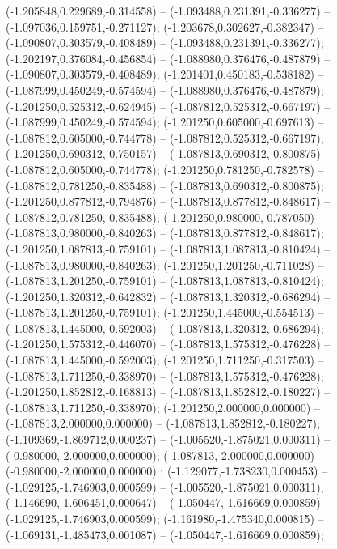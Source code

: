  (-1.205848,0.229689,-0.314558) -- (-1.093488,0.231391,-0.336277) -- (-1.097036,0.159751,-0.271127);
 (-1.203678,0.302627,-0.382347) -- (-1.090807,0.303579,-0.408489) -- (-1.093488,0.231391,-0.336277);
 (-1.202197,0.376084,-0.456854) -- (-1.088980,0.376476,-0.487879) -- (-1.090807,0.303579,-0.408489);
 (-1.201401,0.450183,-0.538182) -- (-1.087999,0.450249,-0.574594) -- (-1.088980,0.376476,-0.487879);
 (-1.201250,0.525312,-0.624945) -- (-1.087812,0.525312,-0.667197) -- (-1.087999,0.450249,-0.574594);
 (-1.201250,0.605000,-0.697613) -- (-1.087812,0.605000,-0.744778) -- (-1.087812,0.525312,-0.667197);
 (-1.201250,0.690312,-0.750157) -- (-1.087813,0.690312,-0.800875) -- (-1.087812,0.605000,-0.744778);
 (-1.201250,0.781250,-0.782578) -- (-1.087812,0.781250,-0.835488) -- (-1.087813,0.690312,-0.800875);
 (-1.201250,0.877812,-0.794876) -- (-1.087813,0.877812,-0.848617) -- (-1.087812,0.781250,-0.835488);
 (-1.201250,0.980000,-0.787050) -- (-1.087813,0.980000,-0.840263) -- (-1.087813,0.877812,-0.848617);
 (-1.201250,1.087813,-0.759101) -- (-1.087813,1.087813,-0.810424) -- (-1.087813,0.980000,-0.840263);
 (-1.201250,1.201250,-0.711028) -- (-1.087813,1.201250,-0.759101) -- (-1.087813,1.087813,-0.810424);
 (-1.201250,1.320312,-0.642832) -- (-1.087813,1.320312,-0.686294) -- (-1.087813,1.201250,-0.759101);
 (-1.201250,1.445000,-0.554513) -- (-1.087813,1.445000,-0.592003) -- (-1.087813,1.320312,-0.686294);
 (-1.201250,1.575312,-0.446070) -- (-1.087813,1.575312,-0.476228) -- (-1.087813,1.445000,-0.592003);
 (-1.201250,1.711250,-0.317503) -- (-1.087813,1.711250,-0.338970) -- (-1.087813,1.575312,-0.476228);
 (-1.201250,1.852812,-0.168813) -- (-1.087813,1.852812,-0.180227) -- (-1.087813,1.711250,-0.338970);
 (-1.201250,2.000000,0.000000) -- (-1.087813,2.000000,0.000000) -- (-1.087813,1.852812,-0.180227);
 (-1.109369,-1.869712,0.000237) -- (-1.005520,-1.875021,0.000311) -- (-0.980000,-2.000000,0.000000);
 (-1.087813,-2.000000,0.000000) -- (-0.980000,-2.000000,0.000000) ;
 (-1.129077,-1.738230,0.000453) -- (-1.029125,-1.746903,0.000599) -- (-1.005520,-1.875021,0.000311);
 (-1.146690,-1.606451,0.000647) -- (-1.050447,-1.616669,0.000859) -- (-1.029125,-1.746903,0.000599);
 (-1.161980,-1.475340,0.000815) -- (-1.069131,-1.485473,0.001087) -- (-1.050447,-1.616669,0.000859);
